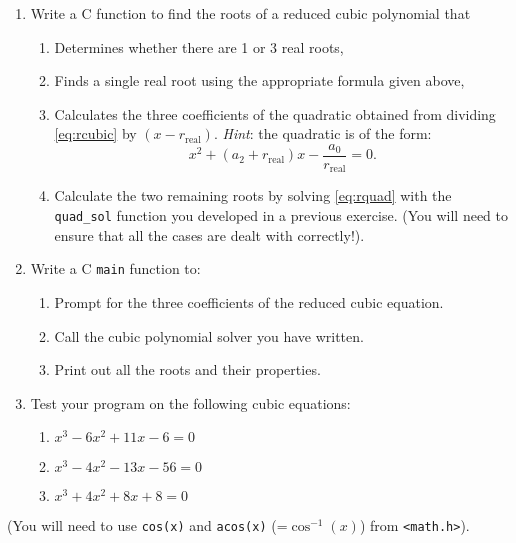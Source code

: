 \documentclass[a4paper,12pt]{article}
\begin{document}
\begin{enumerate}
\item Write a C function to find the roots of a reduced cubic polynomial that
\begin{enumerate}
\item Determines whether there are 1 or 3 real roots,
\item Finds a single real root using the appropriate formula given above,
\item Calculates the three coefficients of the quadratic obtained from  dividing \eqref{eq:rcubic} by $(x-r_\mathrm{real})$. \emph{Hint}: the quadratic is of the form:
\begin{equation}
\label{eq:rquad}
x^2 + (a_2+r_\mathrm{real})x -\frac{a_0}{r_\mathrm{real}} = 0.
\end{equation}
\item Calculate the two remaining roots by solving \eqref{eq:rquad} with the {\tt quad\_sol} function you developed in a previous exercise. (You will need to ensure that all the cases are dealt with correctly!).
\end{enumerate}

\item Write a C {\tt main} function to:
\begin{enumerate}
\item Prompt for the three coefficients of the reduced cubic equation.
\item Call the cubic polynomial solver you have written.
\item Print out all the roots and their properties.
\end{enumerate}
\item Test your program on the following cubic equations:
\begin{enumerate}
\item $x^3-6x^2+11x-6 = 0$
\item $x^3-4x^2-13x-56=0$
\item $x^3+4x^2+8x+8 = 0$
\end{enumerate}
\end{enumerate}
\vfill
(You will need to use {\tt cos(x)} and {\tt acos(x)} (=$\cos^{-1}(x)$) from {\tt <math.h>}).
\end{document}
